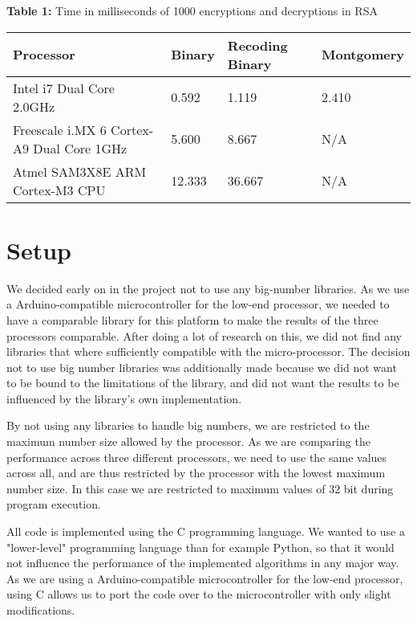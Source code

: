 \documentclass[twocolumn]{IEEEtran}
\begin{document}
\begin{table*}[!htb] 
\textbf{Table 1:} Time in milliseconds of 1000 encryptions and decryptions in RSA \\[1em]
    \centering
    \begin{tabular}{|l|l|l|l|}
    \hline
    {\bf Processor}                                 & {\bf Binary}   & {\bf Recoding Binary} & {\bf Montgomery} \\ \hline
    Intel i7 Dual Core 2.0GHz                 & 0.592 & 1.119        & 2.410   \\ \hline
    Freescale i.MX 6 Cortex-A9 Dual Core 1GHz & 5.600 & 8.667        & N/A       \\ \hline
    Atmel SAM3X8E ARM Cortex-M3 CPU           & 12.333 & 36.667        & N/A       \\ \hline
    \end{tabular}
\end{table*}

\section{Setup}
We decided early on in the project not to use any big-number libraries. As we use a Arduino-compatible microcontroller for the low-end processor, we needed to have a comparable library for this platform to make the results of the three processors comparable. After doing a lot of research on this, we did not find any libraries that where sufficiently compatible with the micro-processor. The decision not to use big number libraries was additionally made because we did not want to be bound to the limitations of the library, and did not want the results to be influenced by the library's own implementation. 

By not using any libraries to handle big numbers, we are restricted to the maximum number size allowed by the processor. As we are comparing the performance across three different processors, we need to use the same values across all, and are thus restricted by the processor with the lowest maximum number size. In this case we are restricted to maximum values of 32 bit during program execution.

All code is implemented using the C programming language.  We wanted to use a "lower-level" programming language than for example Python, so that it would not influence the performance of the implemented algorithms in any major way. As we are using a Arduino-compatible microcontroller for the low-end processor, using C allows us to port the code over to the microcontroller with only slight modifications.
\end{document}
